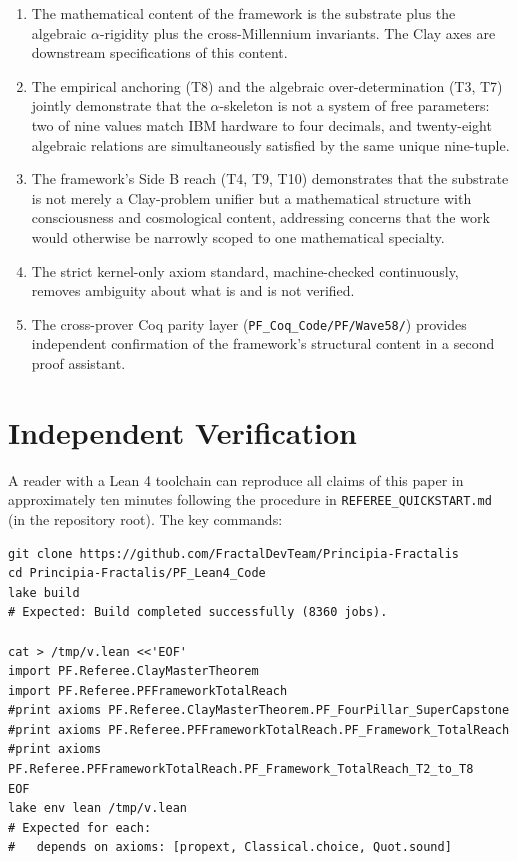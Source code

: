 \documentclass[11pt,a4paper]{article}
\theoremstyle{definition}
\begin{document}
\begin{enumerate}
\item The mathematical content of the framework is the substrate
plus the algebraic $\alpha$-rigidity plus the cross-Millennium
invariants. The Clay axes are downstream specifications of this
content.

\item The empirical anchoring (T8) and the algebraic
over-determination (T3, T7) jointly demonstrate that the
$\alpha$-skeleton is not a system of free parameters: two of nine
values match IBM hardware to four decimals, and twenty-eight
algebraic relations are simultaneously satisfied by the same
unique nine-tuple.

\item The framework's Side B reach (T4, T9, T10) demonstrates
that the substrate is not merely a Clay-problem unifier but a
mathematical structure with consciousness and cosmological
content, addressing concerns that the work would otherwise be
narrowly scoped to one mathematical specialty.

\item The strict kernel-only axiom standard, machine-checked
continuously, removes ambiguity about what is and is not verified.

\item The cross-prover Coq parity layer
(\texttt{PF\_Coq\_Code/PF/Wave58/}) provides independent
confirmation of the framework's structural content in a second
proof assistant.
\end{enumerate}

\section{Independent Verification}
\label{sec:verification}

A reader with a Lean 4 toolchain can reproduce all claims of this
paper in approximately ten minutes following the procedure in
\texttt{REFEREE\_QUICKSTART.md} (in the repository root). The
key commands:

\begin{verbatim}
git clone https://github.com/FractalDevTeam/Principia-Fractalis
cd Principia-Fractalis/PF_Lean4_Code
lake build
# Expected: Build completed successfully (8360 jobs).

cat > /tmp/v.lean <<'EOF'
import PF.Referee.ClayMasterTheorem
import PF.Referee.PFFrameworkTotalReach
#print axioms PF.Referee.ClayMasterTheorem.PF_FourPillar_SuperCapstone
#print axioms PF.Referee.PFFrameworkTotalReach.PF_Framework_TotalReach
#print axioms PF.Referee.PFFrameworkTotalReach.PF_Framework_TotalReach_T2_to_T8
EOF
lake env lean /tmp/v.lean
# Expected for each:
#   depends on axioms: [propext, Classical.choice, Quot.sound]
\end{verbatim}
\end{document}
